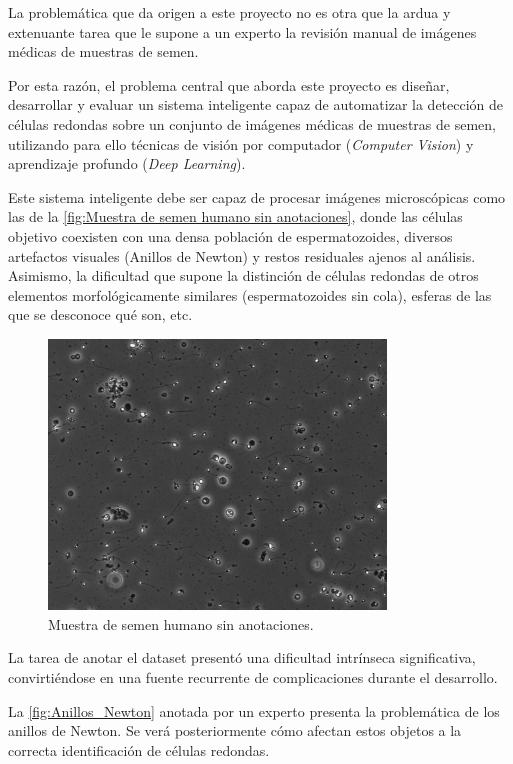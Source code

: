 \documentclass[12pt,a4paper,onecolumn,oneside]{report}
\begin{document}
La problemática que da origen a este proyecto no es otra que la ardua y extenuante tarea que le supone a un experto la revisión manual de imágenes médicas de muestras de semen.

Por esta razón, el problema central que aborda este proyecto es diseñar, desarrollar y evaluar un sistema inteligente capaz de automatizar la detección de células 
redondas sobre un conjunto de imágenes médicas de muestras de semen, utilizando para ello técnicas de visión por computador (\textit{Computer Vision}) y aprendizaje profundo (\textit{Deep Learning}).

Este sistema inteligente debe ser capaz de procesar imágenes microscópicas como las de la \autoref{fig:Muestra de semen humano sin anotaciones}, donde las células objetivo coexisten con una densa población de espermatozoides, diversos artefactos visuales (Anillos de Newton)
y restos residuales ajenos al análisis. Asimismo, la dificultad que supone la distinción de células redondas de otros elementos morfológicamente similares (espermatozoides sin cola), esferas de las que se desconoce qué son, etc.

\begin{figure}[H]
  \centering
  \includegraphics[width=0.8\textwidth]{figuras/rounds_cells/61.jpg}
  \caption{Muestra de semen humano sin anotaciones.}
  \label{fig:Muestra de semen humano sin anotaciones}
\end{figure}

La tarea de anotar el dataset presentó una dificultad intrínseca significativa, convirtiéndose en una fuente recurrente de complicaciones durante el desarrollo. 

La \autoref{fig:Anillos_Newton} anotada por un experto presenta la problemática de los anillos de Newton. Se verá posteriormente cómo afectan estos objetos a la correcta identificación de células redondas.
\end{document}

